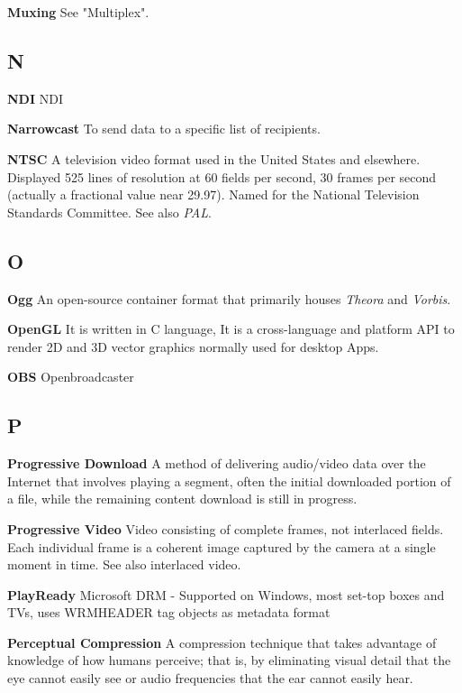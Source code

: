 \smallskip
\textbf{Muxing}
See "Multiplex".


\subsection{N}

\smallskip
\textbf{NDI}
NDI

\smallskip
\textbf{Narrowcast}
To send data to a specific list of recipients.

\smallskip
\textbf{NTSC}
A television video format used in the United States and elsewhere. Displayed 525 lines of resolution at 60 fields per second, 30 frames per second (actually a fractional value near 29.97). Named for the National Television Standards Committee. See also \textit{PAL}.


\subsection{O}

\smallskip
\textbf{Ogg}
An open-source container format that primarily houses \textit{Theora} and \textit{Vorbis}.

\smallskip
\textbf{OpenGL}
It is written in C language, It is a cross-language and platform API to render 2D and 3D vector graphics normally used for desktop Apps.

\smallskip
\textbf{OBS}
Openbroadcaster

\subsection{P}

\smallskip
\textbf{Progressive Download}
A method of delivering audio/video data over the Internet that involves playing a segment, often the initial downloaded portion of a file, while the remaining content download is still in progress.

\smallskip
\textbf{Progressive Video}
Video consisting of complete frames, not interlaced fields. Each individual frame is a coherent image captured by the camera at a single moment in time. See also interlaced video.

\smallskip
\textbf{PlayReady}
Microsoft DRM - Supported on Windows, most set-top boxes and TVs, uses WRMHEADER tag objects as metadata format

\smallskip
\textbf{Perceptual Compression}
A compression technique that takes advantage of knowledge of how humans perceive; that is, by eliminating visual detail that the eye cannot easily see or audio frequencies that the ear cannot easily hear.

